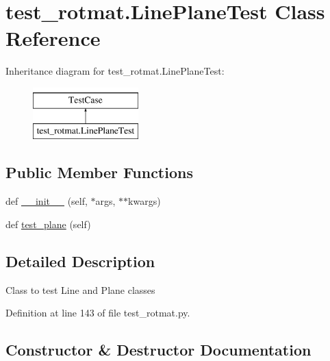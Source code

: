 \hypertarget{classtest__rotmat_1_1LinePlaneTest}{}\section{test\+\_\+rotmat.\+Line\+Plane\+Test Class Reference}
\label{classtest__rotmat_1_1LinePlaneTest}
Inheritance diagram for test\+\_\+rotmat.\+Line\+Plane\+Test\+:\begin{figure}[H]
\begin{center}
\leavevmode
\includegraphics[height=2.000000cm]{classtest__rotmat_1_1LinePlaneTest}
\end{center}
\end{figure}
\subsection*{Public Member Functions}
\begin{DoxyCompactItemize}
\item 
def \mbox{\hyperlink{classtest__rotmat_1_1LinePlaneTest_a3bd4c143500747a11a0fc6480e259343}{\+\_\+\+\_\+init\+\_\+\+\_\+}} (self, $\ast$args, $\ast$$\ast$kwargs)
\item 
def \mbox{\hyperlink{classtest__rotmat_1_1LinePlaneTest_a0fe03ac8059efebb1df1b6c32e0d18ac}{test\+\_\+plane}} (self)
\end{DoxyCompactItemize}


\subsection{Detailed Description}
\begin{DoxyVerb}Class to test Line and Plane classes
\end{DoxyVerb}
 

Definition at line 143 of file test\+\_\+rotmat.\+py.



\subsection{Constructor \& Destructor Documentation}
\mbox{\label{classtest__rotmat_1_1LinePlaneTest_a3bd4c143500747a11a0fc6480e259343}} 
